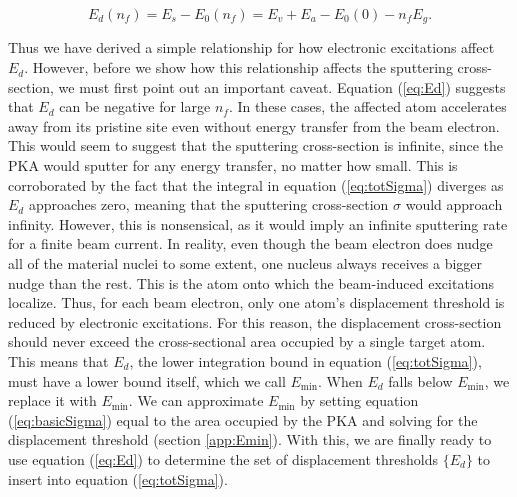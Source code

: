 \documentclass{article}
\begin{document}
\begin{equation}
  E_d(n_f) = E_s - E_0(n_f) = E_v + E_a - E_0(0) - n_f E_g.
  \label{eq:Ed}
\end{equation}

Thus we have derived a simple relationship for how electronic excitations
affect $E_d$.
However, before we show how this relationship affects the sputtering cross-
section, we must first point out an important caveat.
Equation (\ref{eq:Ed}) suggests that $E_d$ can be negative for large $n_f$.
In these cases, the affected atom accelerates away from its pristine site even
without energy transfer from the beam electron.
This would seem to suggest that the sputtering cross-section is infinite, since
the PKA would sputter for any energy transfer, no matter how small.
This is corroborated by the fact that the integral in equation
(\ref{eq:totSigma}) diverges as $E_d$ approaches zero, meaning that the
sputtering cross-section $\sigma$ would approach infinity.
However, this is nonsensical, as it would imply an infinite sputtering rate for
a finite beam current.
In reality, even though the beam electron does nudge all of the material nuclei
to some extent, one nucleus always receives a bigger nudge than the rest.
This is the atom onto which the beam-induced excitations localize.
Thus, for each beam electron, only one atom's displacement threshold is reduced
by electronic excitations.
For this reason, the displacement cross-section should never exceed the
cross-sectional area occupied by a single target atom.
This means that $E_d$, the lower integration bound in equation
(\ref{eq:totSigma}), must have a lower bound itself, which we call
$E_\text{min}$.
When $E_d$ falls below $E_\text{min}$, we replace it with $E_\text{min}$.
We can approximate $E_\text{min}$ by setting equation (\ref{eq:basicSigma})
equal to the area occupied by the PKA and solving for the displacement
threshold (section \ref{app:Emin}).
With this, we are finally ready to use equation (\ref{eq:Ed}) to determine the
set of displacement thresholds $\{E_d\}$ to insert into equation
(\ref{eq:totSigma}).
\end{document}
